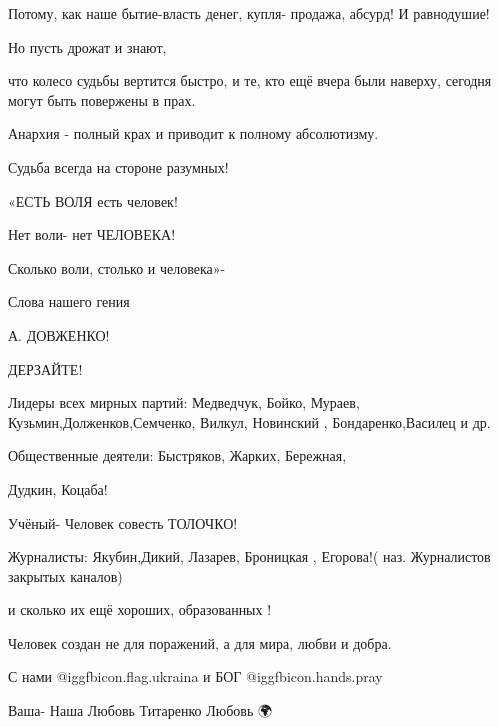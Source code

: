 Потому, как наше бытие-власть денег, купля- продажа, абсурд! И равнодушие! 

Но пусть дрожат и знают,

что колесо судьбы вертится быстро, и те, кто ещё вчера были наверху, сегодня
могут быть повержены в прах.

Анархия - полный крах и приводит к полному абсолютизму. 

Судьба всегда на стороне разумных!  

«ЕСТЬ ВОЛЯ есть человек!

Нет воли- нет ЧЕЛОВЕКА!

Сколько воли, столько и человека»- 

 Слова нашего гения

 А. ДОВЖЕНКО!

ДЕРЗАЙТЕ! 

Лидеры всех мирных партий: Медведчук, Бойко, Мураев,
Кузьмин,Долженков,Семченко, Вилкул, Новинский  ,  Бондаренко,Василец и др.

 Общественные деятели: Быстряков, Жарких, Бережная, 

 Дудкин, Коцаба!

Учёный- Человек совесть ТОЛОЧКО! 

Журналисты: Якубин,Дикий, Лазарев, Броницкая , Егорова!( наз. Журналистов
закрытых каналов)

и сколько их ещё хороших, образованных !

Человек создан не для поражений, а для мира, любви и добра. 

С нами @igg{fbicon.flag.ukraina} и БОГ @igg{fbicon.hands.pray}  

Ваша- Наша Любовь Титаренко Любовь 🌍
